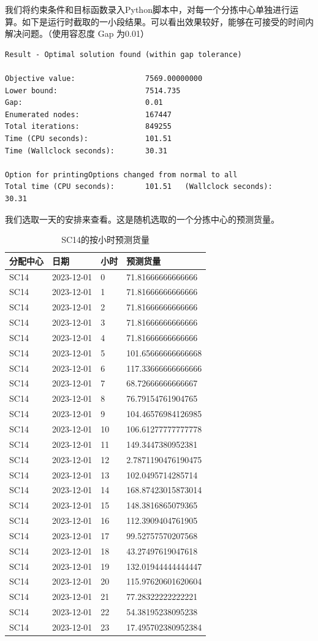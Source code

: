 \documentclass[UTF8]{article}%
\begin{document}
我们将约束条件和目标函数录入Python脚本中，对每一个分拣中心单独进行运算。如下是运行时截取的一小段结果。可以看出效果较好，能够在可接受的时间内解决问题。（使用容忍度 Gap 为0.01）
\begin{lstlisting}
Result - Optimal solution found (within gap tolerance)

Objective value:                7569.00000000
Lower bound:                    7514.735
Gap:                            0.01
Enumerated nodes:               167447
Total iterations:               849255
Time (CPU seconds):             101.51
Time (Wallclock seconds):       30.31

Option for printingOptions changed from normal to all
Total time (CPU seconds):       101.51   (Wallclock seconds):       30.31
\end{lstlisting}
我们选取一天的安排来查看。这是随机选取的一个分拣中心的预测货量。
\begin{table}[!ht]
\renewcommand\arraystretch{1.2}
\caption{SC14的按小时预测货量}%
\centering%
\begin{tabular}{p{4cm}<{\centering}p{4cm}<{\centering}p{2cm}<{\centering}p{4cm}<{\centering}}%
\toprule%
分配中心&日期&小时&预测货量 \\
\midrule%
SC14&2023-12-01&0&71.81666666666666\\ SC14&2023-12-01&1&71.81666666666666\\ SC14&2023-12-01&2&71.81666666666666\\ SC14&2023-12-01&3&71.81666666666666\\ SC14&2023-12-01&4&71.81666666666666\\ SC14&2023-12-01&5&101.65666666666668\\ SC14&2023-12-01&6&117.33666666666666\\ SC14&2023-12-01&7&68.72666666666667\\ SC14&2023-12-01&8&76.79154761904765\\ SC14&2023-12-01&9&104.46576984126985\\ SC14&2023-12-01&10&106.61277777777778\\ SC14&2023-12-01&11&149.3447380952381\\ SC14&2023-12-01&12&2.7871190476190475\\ SC14&2023-12-01&13&102.0495714285714\\ SC14&2023-12-01&14&168.87423015873014\\ SC14&2023-12-01&15&148.3816865079365\\ SC14&2023-12-01&16&112.3909404761905\\ SC14&2023-12-01&17&99.52757570207568\\ SC14&2023-12-01&18&43.27497619047618\\ SC14&2023-12-01&19&132.01944444444447\\ SC14&2023-12-01&20&115.97620601620604\\ SC14&2023-12-01&21&77.28322222222221\\ SC14&2023-12-01&22&54.38195238095238\\ SC14&2023-12-01&23&17.495702380952384\\
\bottomrule%
\end{tabular}
\end{table}
\end{document}
